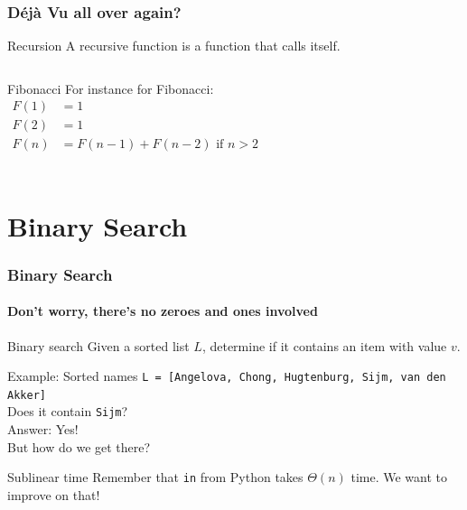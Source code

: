 \begin{frame}
	\frametitle{Déjà Vu all over again?}
	
		\begin{block}{Recursion}
			A recursive function is a function that calls itself.
		\end{block}	
		\pause
		\begin{columns}
			\begin{block}{Fibonacci}
				For instance for Fibonacci:
				\begin{align*}
					F(1) &= 1 \\
					F(2) &= 1 \\
					F(n) &= F(n-1) + F(n-2) \text{ if $n > 2$}\\
				\end{align*}
			\end{block}
			\pause
		
				
		\end{columns}
\end{frame}

\section{Binary Search}
\label{sec:binary_search}


\begin{frame}
	\frametitle{Binary Search}
	\framesubtitle{Don't worry, there's no zeroes and ones involved}

	\begin{block}{Binary search}
		Given a sorted list $L$, determine if it contains an item with value $v$.
	\end{block}
	\pause
	\begin{block}{Example: Sorted names}
		\texttt{L = [Angelova, Chong, Hugtenburg, Sijm, van den Akker]}\\
		Does it contain \texttt{Sijm}?\\
		Answer: Yes!\\
		\pause
		\alert{But how do we get there?}
	\end{block}
	\pause
		\begin{block}{Sublinear time}
			Remember that \texttt{in} from Python takes $\Theta(n)$ time. We want to improve on that!
		\end{block}	
\end{frame}

